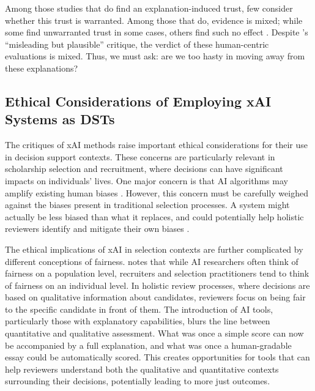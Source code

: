 Among those studies that do find an explanation-induced trust, few consider whether this trust is warranted. Among those that do, evidence is mixed; while some find unwarranted trust in some cases, others find such no effect \cite{lai_human_2019,jacobs_how_2021}. Despite \textcite{Lipton}'s ``misleading but plausible'' critique, the verdict of these human-centric evaluations is mixed. Thus, we must ask: are we too hasty in moving away from these explanations? 

\subsection{Ethical Considerations of Employing xAI Systems as DSTs}
The critiques of xAI methods raise important ethical considerations for their use in decision support contexts. These concerns are particularly relevant in scholarship selection and recruitment, where decisions can have significant impacts on individuals' lives. One major concern is that AI algorithms may amplify existing human biases \cite{MikePerkins_JasperRoe_2023}. However, this concern must be carefully weighed against the biases present in traditional selection processes. A system might actually be less biased than what it replaces, and could potentially help holistic reviewers identify and mitigate their own biases \cite{alvero_ai_2020}.

The ethical implications of xAI in selection contexts are further complicated by different conceptions of fairness. \textcite{alvero_ai_2020} notes that while AI researchers often think of fairness on a population level, recruiters and selection practitioners tend to think of fairness on an individual level. In holistic review processes, where decisions are based on qualitative information about candidates, reviewers focus on being fair to the specific candidate in front of them. The introduction of AI tools, particularly those with explanatory capabilities, blurs the line between quantitative and qualitative assessment. What was once a simple score can now be accompanied by a full explanation, and what was once a human-gradable essay could be automatically scored. This creates opportunities for tools that can help reviewers understand both the qualitative and quantitative contexts surrounding their decisions, potentially leading to more just outcomes.

